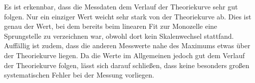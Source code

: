 Es ist erkennbar, dass die Messdaten dem Verlauf der Theoriekurve sehr gut folgen.
Nur ein einziger Wert weicht sehr stark von der Theoriekurve ab. Dies ist genau der
Wert, bei dem bereits beim linearen Fit zur Monozelle eine Sprungstelle zu verzeichnen
war, obwohl dort kein Skalenwechsel stattfand. Auffällig ist zudem, dass die anderen
Messwerte nahe des Maximums etwas über der Theoriekurve liegen.
Da die Werte im Allgemeinen jedoch gut dem Verlauf der Theoriekurve folgen, lässt
sich darauf schließen, dass keine besonders großen systematischen Fehler bei der
Messung vorliegen.
